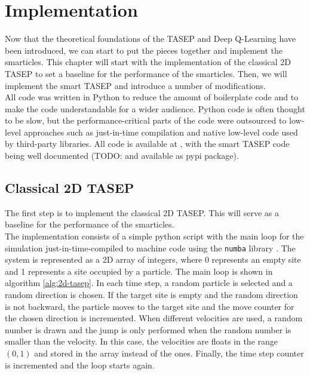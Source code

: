 \graphicspath{{img/impl/out}{img/impl}}

\chapter{Implementation}
\label{ch:implementation}
Now that the theoretical foundations of the TASEP and Deep Q-Learning have been introduced, we can start to put the pieces together and implement the smarticles. This chapter will start with the implementation of the classical 2D TASEP to set a baseline for the performance of the smarticles. Then, we will implement the smart TASEP and introduce a number of modifications. 
\\
All code was written in Python to reduce the amount of boilerplate code and to make the code understandable for a wider audience. Python code is often thought to be slow, but the performance-critical parts of the code were outsourced to low-level approaches such as just-in-time compilation and native low-level code used by third-party libraries. 
All code is available at \cite{maertens_smarttasep_github_2023}, with the smart TASEP code being well documented (TODO: and available as pypi package).

\section{Classical 2D TASEP}
\label{sec:implementation-classical-2d-tasep}
The first step is to implement the classical 2D TASEP. This will serve as a baseline for the performance of the smarticles. 
\\
The implementation consists of a simple python script with the main loop for the simulation just-in-time-compiled to machine code using the \texttt{numba} library \cite{lam_numba_2015}. The system is represented as a 2D array of integers, where 0 represents an empty site and 1 represents a site occupied by a particle. The main loop is shown in algorithm \ref{alg:2d-tasep}. In each time step, a random particle is selected and a random direction is chosen. If the target site is empty and the random direction is not backward, the particle moves to the target site and the move counter for the chosen direction is incremented. When different velocities are used, a random number is drawn and the jump is only performed when the random number is smaller than the velocity. In this case, the velocities are floats in the range $(0,1)$ and stored in the array instead of the ones. Finally, the time step counter is incremented and the loop starts again.


